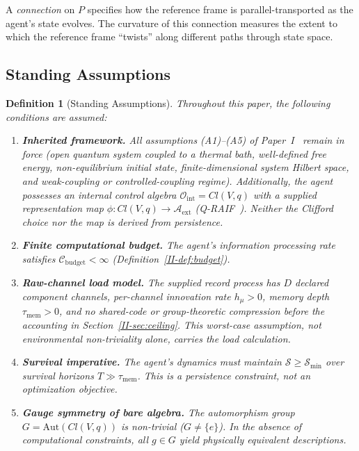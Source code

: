 \documentclass[12pt,a4paper,openany]{book}
\newtheorem{definition}[theorem]{Definition}
\begin{document}
A \emph{connection} on $P$ specifies how the reference frame
is parallel-transported as the agent's state evolves.
The curvature of this connection measures the extent to
which the reference frame ``twists'' along different paths
through state space.

\subsection{Standing Assumptions}
\label{II-subsec:standing}

\begin{definition}[Standing Assumptions]
\label{II-def:assumptions_B}
Throughout this paper, the following conditions are assumed:
\begin{enumerate}
\item[\textup{(B1)}] \textbf{Inherited framework.}
  All assumptions (A1)--(A5) of
  Paper~I~\cite{Liu2026TDOME_I} remain in force
  (open quantum system coupled to a thermal bath,
  well-defined free energy, non-equilibrium initial state,
  finite-dimensional system Hilbert space,
  and weak-coupling or controlled-coupling regime).
  Additionally, the agent possesses an internal control
  algebra $\mathcal{O}_{\mathrm{int}} = Cl(V,q)$
  with a supplied representation map
  $\phi:Cl(V,q)\to\mathcal A_{\mathrm{ext}}$
  (Q-RAIF~\cite{Liu2026QRAIF_C}).  Neither the Clifford choice nor
  the map is derived from persistence.
\item[\textup{(B2)}] \textbf{Finite computational budget.}
  The agent's information processing rate satisfies
  $\mathcal{C}_{\mathrm{budget}} < \infty$
  (Definition~\ref{II-def:budget}).
\item[\textup{(B3)}] \textbf{Raw-channel load model.}
  The supplied record process has $D$ declared component channels,
  per-channel innovation rate $h_\mu>0$, memory depth
  $\tau_{\mathrm{mem}}>0$, and no shared-code or group-theoretic
  compression before the accounting in Section~\ref{II-sec:ceiling}.
  This worst-case assumption, not environmental non-triviality alone,
  carries the load calculation.
\item[\textup{(B4)}] \textbf{Survival imperative.}
  The agent's dynamics must maintain
  $\mathcal{S} \geq \mathcal{S}_{\min}$
  over survival horizons
  $T \gg \tau_{\mathrm{mem}}$.
  This is a persistence constraint, not an optimization
  objective.
\item[\textup{(B5)}] \textbf{Gauge symmetry of bare
  algebra.}
  The automorphism group $G = \mathrm{Aut}(Cl(V,q))$
  is non-trivial ($G \neq \{e\}$).
  In the absence of computational constraints, all
  $g \in G$ yield physically equivalent descriptions.
\end{enumerate}
\end{definition}
\end{document}

